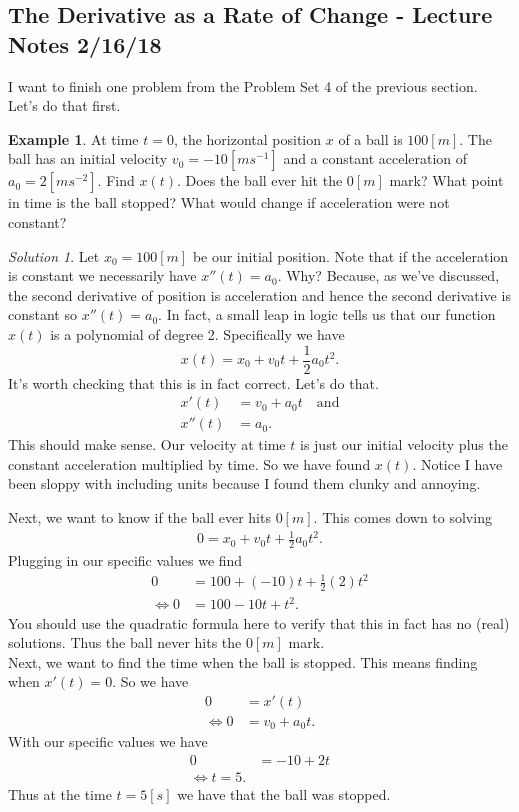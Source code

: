 \documentclass[leqno]{article}
\theoremstyle{definition}
\newtheorem{example}{Example}[section]
\theoremstyle{remark}
\newtheorem*{solution}{Solution}
\theoremstyle{theorem}
\begin{document}
\subsection{The Derivative as a Rate of Change - Lecture Notes 2/16/18}

I want to finish one problem from the Problem Set 4 of the previous section.  Let's do that first.

\begin{example}
At time $t=0$, the horizontal position $x$ of a ball is $100[m]$.  The ball has an initial velocity $v_0=-10[ms^{-1}]$ and a constant acceleration of $a_0=2[ms^{-2}]$.  Find $x(t)$. Does the ball ever hit the $0[m]$ mark? What point in time is the ball stopped? What would change if acceleration were not constant?\\
\begin{solution}
Let $x_0=100[m]$ be our initial position.  Note that if the acceleration is constant we necessarily have $x''(t)=a_0$.  Why? Because, as we've discussed, the second derivative of position is acceleration and hence the second derivative is constant so $x''(t)=a_0$. In fact, a small leap in logic tells us that our function $x(t)$ is a polynomial of degree 2.  Specifically we have
\[
x(t)=x_0+v_0 t + \frac{1}{2} a_0 t^2.
\]
It's worth checking that this is in fact correct. Let's do that. 
\begin{align*}
x'(t)&=v_0+a_0 t \quad \textrm{and}\\
x''(t)&=a_0.
\end{align*}
This should make sense.  Our velocity at time $t$ is just our initial velocity plus the constant acceleration multiplied by time. So we have found $x(t)$. Notice I have been sloppy with including units because I found them clunky and annoying.

Next, we want to know if the ball ever hits $0[m]$.  This comes down to solving
\begin{align*}
0=x_0+v_0t+\frac{1}{2}a_0t^2.
\end{align*}
Plugging in our specific values we find
\begin{align*}
0&=100+(-10)t+\frac{1}{2}(2)t^2\\
\iff 0&=100-10t+t^2.
\end{align*}
You should use the quadratic formula here to verify that this in fact has no (real) solutions. Thus the ball never hits the $0[m]$ mark.
\vspace*{3cm}\\

Next, we want to find the time when the ball is stopped.  This means finding when $x'(t)=0$. So we have
\begin{align*}
0&=x'(t)\\
\iff 0&=v_0+a_0t.
\end{align*}
With our specific values we have
\begin{align*}
0&=-10+2t\\
\iff t=5.
\end{align*}
Thus at the time $t=5[s]$ we have that the ball was stopped.


\end{solution}
\end{example}
\end{document}
